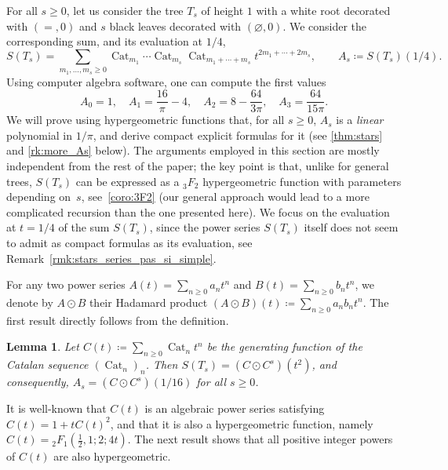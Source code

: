 \documentclass[12pt]{amsart}
\newcommand{\revision}[1]{{#1}}
\theoremstyle{plain}
\newtheorem{lemma}{Lemma}
\theoremstyle{remark}
\DeclareMathOperator{\Cat}{Cat}
\begin{document}
For all $s \geq 0$, let us consider the tree $T_s$ of height $1$ with a white root decorated with $(=,0)$
and $s$ black leaves decorated with $(\varnothing,0)$.
We consider the corresponding sum, \revision{and its evaluation at $1/4$,}
 \begin{equation}\label{eq:basic}
	\revision{S(T_s)} =
\sum_{m_1,\dots,m_s \geq 0}
\Cat_{m_1}
\cdots
\Cat_{m_s}
\Cat_{m_1 + \cdots + m_s}
\revision{{t}^{2m_1 + \cdots + 2m_s}, \qquad A_s \coloneqq S(T_s)(1/4)}.
\end{equation}
\revision{Using computer algebra software, one can compute the first values 
\[A_0 = 1, \quad A_1 = \frac{16}{\pi} - 4, \quad  A_2 = 8 - \frac{64}{3 \pi}, \quad  A_3 = \frac{64}{15 \pi} .\]
}
We will prove using hypergeometric functions that, for all $s \geq 0$,
$A_s$ is a {\em linear} polynomial in $1/\pi$, and derive compact explicit formulas
for it (see \cref{thm:stars} and \cref{rk:more_As} below).
The arguments employed in this section are mostly independent from the rest of the paper;
\revision{the key point is that, unlike for general trees, $S(T_s)$ can be expressed as a ${}_{3}^{}{{}{{}{F_{2}^{}}}}$ hypergeometric function with parameters depending on~$s$}, 
see~\cref{coro:3F2}
(our general approach would lead to a more complicated recursion than the one presented here).
We focus on the evaluation at $t=1/4$ of the sum $S(T_s)$,
since the power series $S(T_s)$ itself does not seem to admit as compact formulas as its evaluation,
see Remark~\ref{rmk:stars_series_pas_si_simple}.
\medskip 

For any two power series $A(t) = \sum_{n \geq 0} a_n t^n$ and $B(t) = \sum_{n \geq 0} b_n t^n$, we denote by $A\odot B$ their Hadamard product 
$(A\odot B) (t) \coloneqq \sum_{n \geq 0} a_n b_n t^n$. The first result directly follows from the definition.

\begin{lemma}\label{lem:Hadamard}
Let $C(t) \coloneqq  \sum_{n \geq 0} \Cat_n t^n$ be the generating function of the Catalan sequence $(\Cat_n)_n$.
Then \revision{$S(T_s)=(C\odot C^s)(t^2)$, and consequently,}
$A_s = (C\odot C^s) (1/16)$ for all $s\geq 0$.
\end{lemma}

It is well-known that $C(t)$ is an algebraic power series satisfying $C(t) =  1 +  t C(t)^2$, and that it is also a hypergeometric \revision{function}, namely 
$C(t) = {}_{2}^{}{{}{{}{F_{1}^{}}}} \left(\frac{1}{2},1;2; 4t \right) .$
The next result shows that all positive integer powers of $C(t)$ are also hypergeometric.
\end{document}
